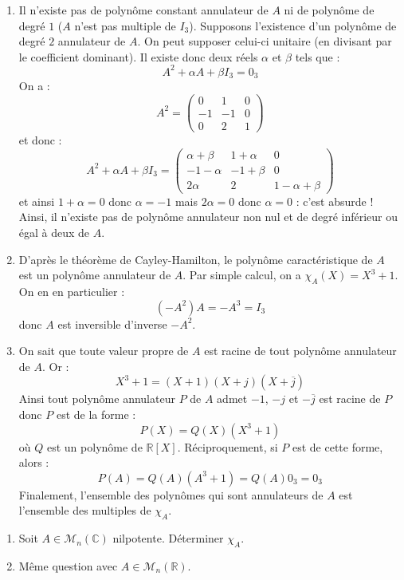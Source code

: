 \documentclass[a4paper,10pt]{report}
\begin{document}
\corr \begin{enumerate}
\item Il n'existe pas de polynôme constant annulateur de $A$ ni de polynôme de degré $1$ ($A$ n'est pas multiple de $I_3$). Supposons l'existence d'un polynôme de degré $2$ annulateur de $A$. On peut supposer celui-ci unitaire (en divisant par le coefficient dominant). Il existe donc deux réels $\alpha$ et $\beta$ tels que :
$$ A^2 + \alpha A + \beta I_3 = 0_3$$
On a :
$$ A^2 = \begin{pmatrix}
0 & 1 & 0 \\
-1 & -1 & 0 \\
0 & 2 & 1 
\end{pmatrix}$$
et donc :
$$ A^2+ \alpha A + \beta I_3 = \begin{pmatrix}
\alpha+ \beta & 1+ \alpha & 0 \\
-1- \alpha & -1+ \beta & 0 \\
2 \alpha & 2 & 1  - \alpha + \beta
\end{pmatrix}$$
et ainsi $1+ \alpha = 0$ donc $\alpha =-1$ mais $2 \alpha = 0$ donc $\alpha = 0$ : c'est absurde ! Ainsi, il n'existe pas de polynôme annulateur non nul et de degré inférieur ou égal à deux de $A$.
\item D'après le théorème de Cayley-Hamilton, le polynôme caractéristique de $A$ est un polynôme annulateur de $A$. Par simple calcul, on a $\chi_A(X) = X^3+1$. On en en particulier :
$$ (-A^2)A= -A^3 = I_3$$
donc $A$ est inversible d'inverse $-A^2$.
\item On sait que toute valeur propre de $A$ est racine de tout polynôme annulateur de $A$. Or :
$$ X^3+1 = (X+1) (X+j)(X+ \overline{j})$$
Ainsi tout polynôme annulateur $P$ de $A$ admet $-1$, $-j$ et $- \overline{j}$ est racine de $P$ donc $P$ est de la forme :
$$ P(X)= Q(X) (X^3+1)$$
où $Q$ est un polynôme de $\mathbb{R}[X]$. Réciproquement, si $P$ est de cette forme, alors :
$$ P(A) = Q(A)(A^3+1) = Q(A) 0_3 = 0_3$$
Finalement, l'ensemble des polynômes qui sont annulateurs de $A$ est l'ensemble des multiples de $\chi_A$.
\end{enumerate}

\begin{Exa}
  \begin{enumerate}
  \item  Soit $A \in \mathcal{M}_{n}(\mathbb{C})$ nilpotente. Déterminer $\chi_{A}$.
  \item Même question avec $A \in \mathcal{M}_{n}(\mathbb{R})$.
  \end{enumerate}
\end{Exa} 
\end{document}
